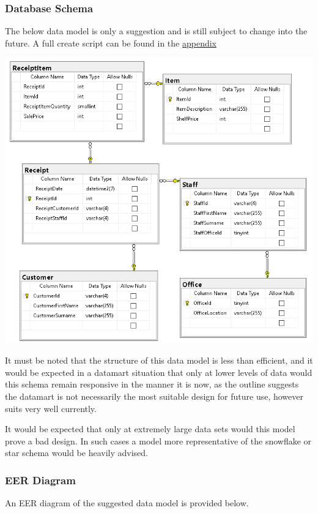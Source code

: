\documentclass{article}
\begin{document}
    \subsubsection{Database Schema}
    The below data model is only a suggestion and is still subject to change into the future. A full create script can be found in the \hyperref[sec:Appendix]{\color{blue}appendix}
        \begin{center}
            \includegraphics[width=\textwidth,keepaspectratio]{Images/schema.PNG}
        \end{center}
    It must be noted that the structure of this data model is 
    less than efficient, and it would be expected in a datamart
    situation that only at lower levels of data would this schema
    remain responsive in the manner it is now, as the outline
    suggests the datamart is not necessarily the most suitable
    design for future use, however suits very well currently.
    \par
    It would be expected that only at extremely large data sets
    would this model prove a bad design. In such cases a model 
    more representative of the snowflake or star schema would be
    heavily advised.

    \newpage
    \subsubsection{EER Diagram}
    An EER diagram of the suggested data model is provided below. 
\end{document}
